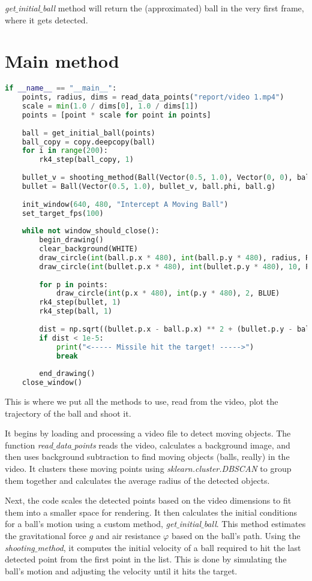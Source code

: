 \documentclass{article}
\begin{document}
	\textit{get$\_$initial$\_$ball} method will return the (approximated) ball in the very first frame, where it gets detected.
	
	\section*{Main method}
	
	\begin{lstlisting}[language=python]
if __name__ == "__main__":
	points, radius, dims = read_data_points("report/video 1.mp4")
	scale = min(1.0 / dims[0], 1.0 / dims[1])
	points = [point * scale for point in points]
	
	ball = get_initial_ball(points)
	ball_copy = copy.deepcopy(ball)
	for i in range(200):
		rk4_step(ball_copy, 1)
	
	bullet_v = shooting_method(Ball(Vector(0.5, 1.0), Vector(0, 0), ball.phi, ball.g), ball_copy.p, 1, 200)
	bullet = Ball(Vector(0.5, 1.0), bullet_v, ball.phi, ball.g)
	
	init_window(640, 480, "Intercept A Moving Ball")
	set_target_fps(100)
	
	while not window_should_close():
		begin_drawing()
		clear_background(WHITE)
		draw_circle(int(ball.p.x * 480), int(ball.p.y * 480), radius, RED)
		draw_circle(int(bullet.p.x * 480), int(bullet.p.y * 480), 10, PURPLE)
		
		for p in points:
			draw_circle(int(p.x * 480), int(p.y * 480), 2, BLUE)
		rk4_step(bullet, 1)
		rk4_step(ball, 1)
		
		dist = np.sqrt((bullet.p.x - ball.p.x) ** 2 + (bullet.p.y - ball.p.y) ** 2)
		if dist < 1e-5:
			print("<----- Missile hit the target! ----->")
			break
		
		end_drawing()
	close_window()
	\end{lstlisting}
	
	This is where we put all the methods to use, read from the video, plot the trajectory of the ball and shoot it.
	
	It begins by loading and processing a video file to detect moving objects. The function \textit{read$\_$data$\_$points} reads the video, calculates a background image, and then uses background subtraction to find moving objects (balls, really) in the video. It clusters these moving points using \textit{sklearn.cluster.DBSCAN} to group them together and calculates the average radius of the detected objects.
	
	Next, the code scales the detected points based on the video dimensions to fit them into a smaller space for rendering. It then calculates the initial conditions for a ball's motion using a custom method, \textit{get$\_$initial$\_$ball}. This method estimates the gravitational force $g$ and air resistance $\varphi$ based on the ball's path. Using the \textit{shooting$\_$method}, it computes the initial velocity of a ball required to hit the last detected point from the first point in the list. This is done by simulating the ball's motion and adjusting the velocity until it hits the target.
	
\end{document}
